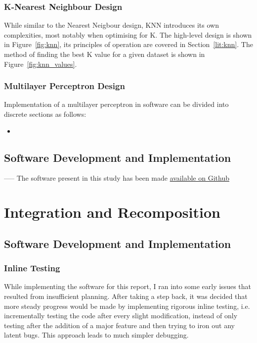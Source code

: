 \subsubsection{K-Nearest Neighbour Design}
While similar to the Nearest Neigbour design, 
KNN introduces its own complexities, most notably when optimising for K. The high-level design is shown in Figure~\ref{fig:knn}, its principles of operation are covered in Section~\ref{lit:knn}. The method of finding the best K value for a given dataset is shown in Figure~\ref{fig:knn_values}.




\subsubsection{Multilayer Perceptron Design}

Implementation of a multilayer perceptron in software can be divided into discrete sections as follows:
\begin{itemize}
	\item
	
	
	
	
\end{itemize}


\subsection{Software Development and Implementation}




-----
The software present in this study has been made \href{http://github.com/roansong}{available on Github}

\section{Integration and Recomposition}
\subsection{Software Development and Implementation}

\subsubsection{Inline Testing}
While implementing the software for this report, I ran into some early issues that resulted from insufficient planning. After taking a step back, it was decided that more steady progress would be made by implementing rigorous inline testing, i.e. incrementally testing the code after every slight modification, instead of only testing after the addition of a major feature and then trying to iron out any latent bugs. This approach leads to much simpler debugging.

